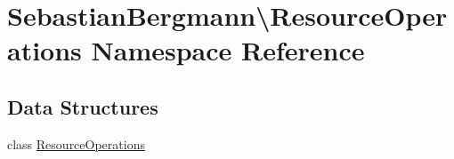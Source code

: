 \hypertarget{namespace_sebastian_bergmann_1_1_resource_operations}{}\section{Sebastian\+Bergmann\textbackslash{}Resource\+Operations Namespace Reference}
\label{namespace_sebastian_bergmann_1_1_resource_operations}
\subsection*{Data Structures}
\begin{DoxyCompactItemize}
\item 
class \mbox{\hyperlink{class_sebastian_bergmann_1_1_resource_operations_1_1_resource_operations}{Resource\+Operations}}
\end{DoxyCompactItemize}
